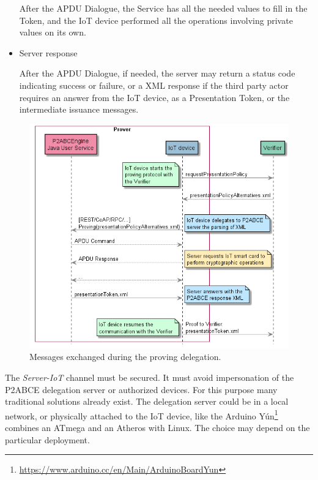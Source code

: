 \begin{itemize}
	After the APDU Dialogue, the Service has all the needed values to fill in the Token, and the IoT device performed all the operations involving private values on its own.
	
	
	\item Server response
	
	After the APDU Dialogue, if needed, the server may return a status code indicating success or failure, or a XML response if the third party actor requires an answer from the IoT device, as a Presentation Token, or the intermediate issuance messages.
	
\end{itemize}

\begin{figure}[bth]
	\centering
	\includegraphics[width=\linewidth]{gfx/UML/provingDelegation}
	\caption{Messages exchanged during the proving delegation.}
	\label{fig:DelegationProving}
\end{figure}



The \textit{Server-IoT} channel must be secured. It must avoid impersonation of the P2ABCE delegation server or authorized devices. For this purpose many traditional solutions already exist. The delegation server could be in a local network, or physically attached to the IoT device, like the Arduino Y\'un\footnote{\url{https://www.arduino.cc/en/Main/ArduinoBoardYun}} combines an ATmega and an Atheros with Linux. The choice may depend on the particular deployment.


